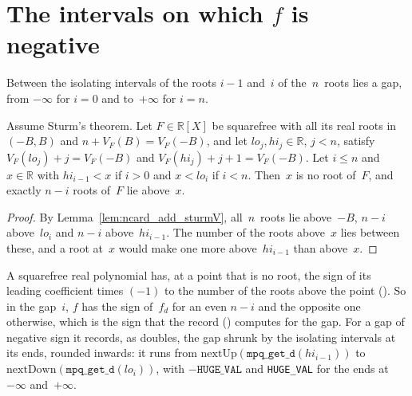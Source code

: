
\section{The intervals on which \texorpdfstring{$f$}{f} is negative}\label{sec:negativeIntervals}

Between the isolating intervals of the roots $i - 1$ and~$i$ of the~$n$~roots lies a gap, from
$-\infty$ for $i = 0$ and to~$+\infty$ for $i = n$.

\begin{lemma}\label{lem:not_isRoot_and_ncard_eq}
  \leanok
  Assume Sturm's theorem. Let $F \in \mathbb{R}[X]$ be squarefree with all its real roots in
  $(-B, B)$ and $n + V_F(B) = V_F(-B)$, and let $lo_j, hi_j \in \mathbb{R}$, $j < n$, satisfy
  $V_F(lo_j) + j = V_F(-B)$ and $V_F(hi_j) + j + 1 = V_F(-B)$. Let $i \le n$ and $x \in \mathbb{R}$
  with $hi_{i-1} < x$ if $i > 0$ and $x < lo_i$ if $i < n$. Then~$x$ is no root of~$F$, and exactly
  $n - i$ roots of~$F$ lie above~$x$.
\end{lemma}

\begin{proof}
  \leanok
  By Lemma~\ref{lem:ncard_add_sturmV}, all~$n$~roots lie above~$-B$, $n - i$ above~$lo_i$ and
  $n - i$ above~$hi_{i-1}$. The number of the roots above~$x$ lies between these, and a root at~$x$
  would make one more above~$hi_{i-1}$ than above~$x$.
\end{proof}

A squarefree real polynomial has, at a point that is no root, the sign of its leading coefficient
times $(-1)$ to the number of the roots above the point
(). So in the gap~$i$, $f$
has the sign of~$f_d$ for an even $n - i$ and the opposite one otherwise, which is the sign that
the record () computes for the gap. For a gap of negative sign it
records, as doubles, the gap shrunk by the isolating intervals at its ends, rounded inwards: it
runs from
$\mathrm{nextUp}(\texttt{mpq\_get\_d}(hi_{i-1}))$ to $\mathrm{nextDown}(\texttt{mpq\_get\_d}(lo_i))$,
with $-\texttt{HUGE\_VAL}$ and \texttt{HUGE\_VAL} for the ends at $-\infty$ and~$+\infty$.

